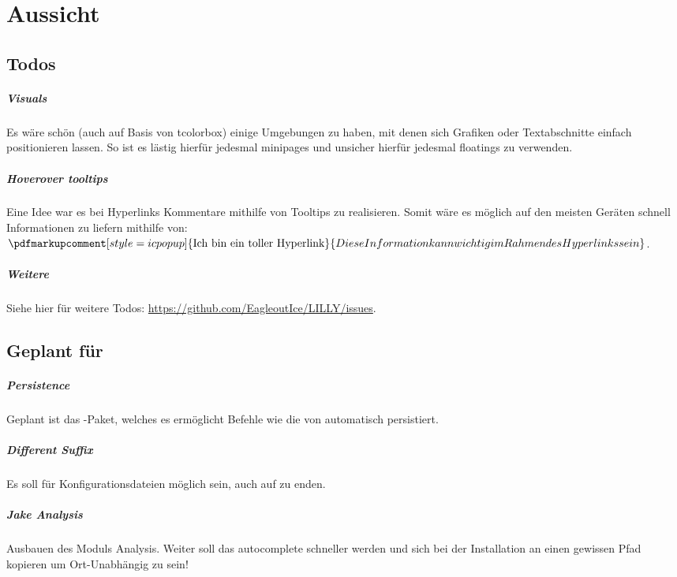 \chapter{Aussicht}

\section{Todos}
\paragraph{Visuals}
Es wäre schön (auch auf Basis von tcolorbox) einige Umgebungen zu haben, mit denen sich Grafiken oder Textabschnitte einfach positionieren lassen. So ist es lästig hierfür jedesmal minipages und unsicher hierfür jedesmal floatings zu verwenden.

\paragraph{Hoverover tooltips}

Eine Idee war es bei Hyperlinks Kommentare mithilfe von Tooltips zu realisieren. Somit wäre es möglich auf den meisten Geräten schnell Informationen zu liefern mithilfe von: $\pdfmarkupcomment[style=icpopup]{\text{Ich bin ein toller Hyperlink}}{Diese Information kann wichtig im Rahmen des Hyperlinks sein}$.

\paragraph{Weitere}
Siehe hier für weitere Todos: \url{https://github.com/EagleoutIce/LILLY/issues}.

\section{Geplant für \small{}}

\paragraph{Persistence}
Geplant ist das -Paket, welches es ermöglicht Befehle wie die von  automatisch persistiert.

\paragraph{Different Suffix}
Es soll für Konfigurationsdateien möglich sein, auch auf  zu enden.

\paragraph{Jake Analysis}
Ausbauen des \Jake[-]Moduls Analysis. Weiter soll das autocomplete schneller werden und sich \Jake bei der Installation an einen gewissen Pfad kopieren um Ort-Unabhängig zu sein!

